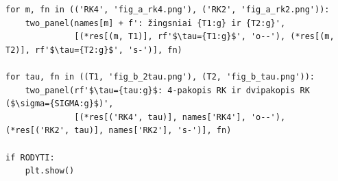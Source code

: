 \documentclass[12pt,a4paper]{article}
\begin{document}
\begin{lstlisting}
for m, fn in (('RK4', 'fig_a_rk4.png'), ('RK2', 'fig_a_rk2.png')):
    two_panel(names[m] + f': žingsniai {T1:g} ir {T2:g}',
              [(*res[(m, T1)], rf'$\tau={T1:g}$', 'o--'), (*res[(m, T2)], rf'$\tau={T2:g}$', 's-')], fn)

for tau, fn in ((T1, 'fig_b_2tau.png'), (T2, 'fig_b_tau.png')):
    two_panel(rf'$\tau={tau:g}$: 4-pakopis RK ir dvipakopis RK ($\sigma={SIGMA:g}$)',
              [(*res[('RK4', tau)], names['RK4'], 'o--'), (*res[('RK2', tau)], names['RK2'], 's-')], fn)

if RODYTI:
    plt.show()
\end{lstlisting}
\end{document}
